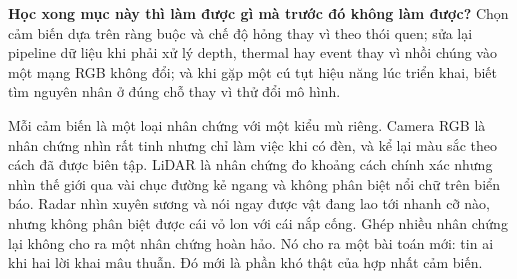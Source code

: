 \documentclass[../../../deep_learning.tex]{subfiles}
\begin{document}
\textbf{Học xong mục này thì làm được gì mà trước đó không làm được?} Chọn cảm biến dựa trên ràng buộc và chế độ hỏng thay vì theo thói quen; sửa lại pipeline dữ liệu khi phải xử lý depth, thermal hay event thay vì nhồi chúng vào một mạng RGB không đổi; và khi gặp một cú tụt hiệu năng lúc triển khai, biết tìm nguyên nhân ở đúng chỗ thay vì thử đổi mô hình.

\begin{trucgiac}
Mỗi cảm biến là một loại nhân chứng với một kiểu mù riêng. Camera RGB là nhân chứng nhìn rất tinh nhưng chỉ làm việc khi có đèn, và kể lại màu sắc theo cách đã được biên tập. LiDAR là nhân chứng đo khoảng cách chính xác nhưng nhìn thế giới qua vài chục đường kẻ ngang và không phân biệt nổi chữ trên biển báo. Radar nhìn xuyên sương và nói ngay được vật đang lao tới nhanh cỡ nào, nhưng không phân biệt được cái vỏ lon với cái nắp cống. Ghép nhiều nhân chứng lại không cho ra một nhân chứng hoàn hảo. Nó cho ra một bài toán mới: tin ai khi hai lời khai mâu thuẫn. Đó mới là phần khó thật của hợp nhất cảm biến.
\end{trucgiac}
\end{document}
